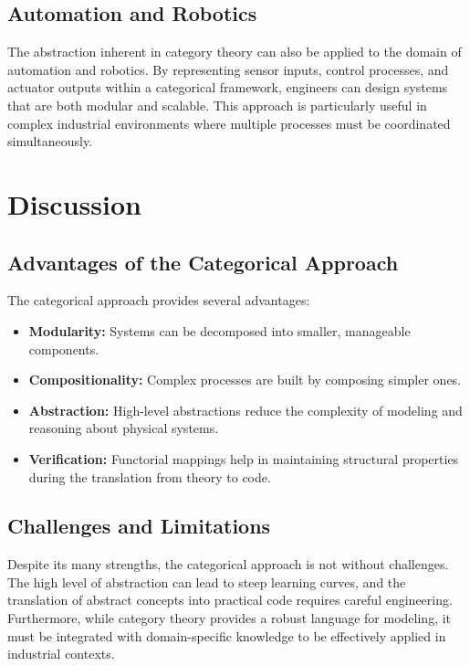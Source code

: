 \documentclass[11pt]{article}
\begin{document}
\subsection{Automation and Robotics}
The abstraction inherent in category theory can also be applied to the domain of automation and robotics. By representing sensor inputs, control processes, and actuator outputs within a categorical framework, engineers can design systems that are both modular and scalable. This approach is particularly useful in complex industrial environments where multiple processes must be coordinated simultaneously.

\section{Discussion}
\subsection{Advantages of the Categorical Approach}
The categorical approach provides several advantages:
\begin{itemize}
    \item \textbf{Modularity:} Systems can be decomposed into smaller, manageable components.
    \item \textbf{Compositionality:} Complex processes are built by composing simpler ones.
    \item \textbf{Abstraction:} High-level abstractions reduce the complexity of modeling and reasoning about physical systems.
    \item \textbf{Verification:} Functorial mappings help in maintaining structural properties during the translation from theory to code.
\end{itemize}

\subsection{Challenges and Limitations}
Despite its many strengths, the categorical approach is not without challenges. The high level of abstraction can lead to steep learning curves, and the translation of abstract concepts into practical code requires careful engineering. Furthermore, while category theory provides a robust language for modeling, it must be integrated with domain-specific knowledge to be effectively applied in industrial contexts.
\end{document}
